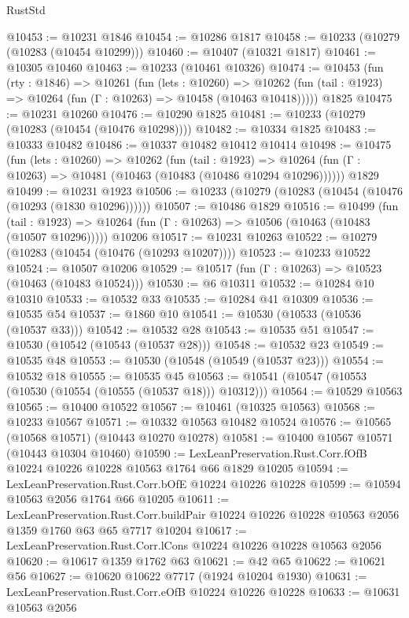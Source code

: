 \begin{lexlean}{RustStd}
\begin{coremodule}
@10453 := @10231 @1846
@10454 := @10286 @1817
@10458 := @10233 (@10279 (@10283 (@10454 @10299)))
@10460 := @10407 (@10321 @1817)
@10461 := @10305 @10460
@10463 := @10233 (@10461 @10326)
@10474 := @10453
    (fun (rty : @1846) =>
    @10261
      (fun (lets : @10260) =>
      @10262 (fun (tail : @1923) => @10264 (fun (Γ : @10263) => @10458 (@10463 @10418)))))
    @1825
@10475 := @10231 @10260
@10476 := @10290 @1825
@10481 := @10233 (@10279 (@10283 (@10454 (@10476 @10298))))
@10482 := @10334 @1825
@10483 := @10333 @10482
@10486 := @10337 @10482 @10412 @10414
@10498 := @10475
    (fun (lets : @10260) =>
    @10262
      (fun (tail : @1923) =>
      @10264 (fun (Γ : @10263) => @10481 (@10463 (@10483 (@10486 @10294 @10296))))))
    @1829
@10499 := @10231 @1923
@10506 := @10233 (@10279 (@10283 (@10454 (@10476 (@10293 (@1830 @10296))))))
@10507 := @10486 @1829
@10516 := @10499
    (fun (tail : @1923) => @10264 (fun (Γ : @10263) => @10506 (@10463 (@10483 (@10507 @10296)))))
    @10206
@10517 := @10231 @10263
@10522 := @10279 (@10283 (@10454 (@10476 (@10293 @10207))))
@10523 := @10233 @10522
@10524 := @10507 @10206
@10529 := @10517 (fun (Γ : @10263) => @10523 (@10463 (@10483 @10524)))
@10530 := @6 @10311
@10532 := @10284 @10 @10310
@10533 := @10532 @33
@10535 := @10284 @41 @10309
@10536 := @10535 @54
@10537 := @1860 @10
@10541 := @10530 (@10533 (@10536 (@10537 @33)))
@10542 := @10532 @28
@10543 := @10535 @51
@10547 := @10530 (@10542 (@10543 (@10537 @28)))
@10548 := @10532 @23
@10549 := @10535 @48
@10553 := @10530 (@10548 (@10549 (@10537 @23)))
@10554 := @10532 @18
@10555 := @10535 @45
@10563 := @10541 (@10547 (@10553 (@10530 (@10554 (@10555 (@10537 @18))) @10312)))
@10564 := @10529 @10563
@10565 := @10400 @10522
@10567 := @10461 (@10325 @10563)
@10568 := @10233 @10567
@10571 := @10332 @10563 @10482 @10524
@10576 := @10565 (@10568 @10571) (@10443 @10270 @10278)
@10581 := @10400 @10567 @10571 (@10443 @10304 @10460)
@10590 := LexLeanPreservation.Rust.Corr.fOfB @10224 @10226 @10228 @10563 @1764 @66 @1829 @10205
@10594 := LexLeanPreservation.Rust.Corr.bOfE @10224 @10226 @10228
@10599 := @10594 @10563 @2056 @1764 @66 @10205
@10611 := LexLeanPreservation.Rust.Corr.buildPair
    @10224
    @10226
    @10228
    @10563
    @2056
    @1359
    @1760
    @63
    @65
    @7717
    @10204
@10617 := LexLeanPreservation.Rust.Corr.lCons @10224 @10226 @10228 @10563 @2056
@10620 := @10617 @1359 @1762 @63
@10621 := @42 @65
@10622 := @10621 @56
@10627 := @10620 @10622 @7717 (@1924 @10204 @1930)
@10631 := LexLeanPreservation.Rust.Corr.eOfB @10224 @10226 @10228
@10633 := @10631 @10563 @2056

\end{coremodule}
\end{lexlean}
